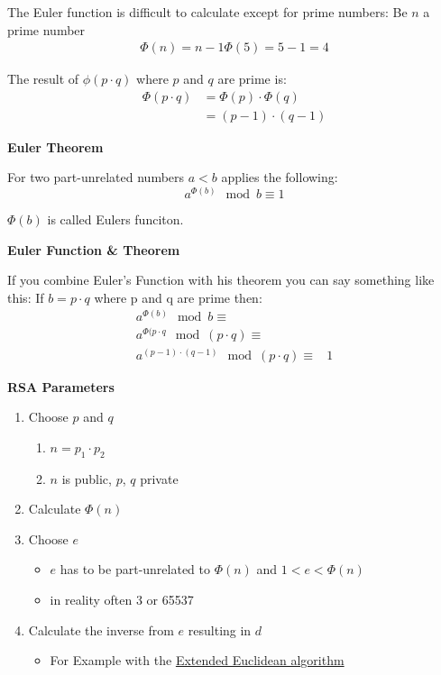 \documentclass[11pt,twoside,twocolumn,landscape]{article}
\begin{document}
The Euler function is difficult to calculate except for prime numbers:
Be \(n\) a prime number
\begin{align}
\Phi(n) = n - 1
\Phi(5) = 5 - 1 = 4
\end{align}

The result of \(\phi(p \cdot q)\) where \(p\) and \(q\) are prime is:
\begin{align}
\Phi(p \cdot q) &= \Phi(p) \cdot \Phi(q) \\
&= (p - 1) \cdot (q - 1)
\end{align}

\textbf{Euler Theorem}

For two part-unrelated numbers \(a < b\) applies the following:
\begin{equation}
a^{\Phi(b)} \mod b \equiv 1
\end{equation}


\(\Phi(b)\) is called Eulers funciton.

\textbf{Euler Function \& Theorem}

If you combine Euler's Function with his theorem you can say something like this:
If \(b = p \cdot q\) where p and q are prime then:
\begin{align}
a^{\Phi(b)} \mod b \equiv & \\
a^{\Phi(p \cdot q} \mod (p \cdot q) \equiv & \\
a^{(p - 1) \cdot (q-1)} \mod (p \cdot q) \equiv & 1
\end{align}

\textbf{RSA Parameters}

\begin{enumerate}
\item Choose \(p\) and \(q\)
\begin{enumerate}
\item \(n = p_1 \cdot p_2\)
\item \(n\) is public, \(p\), \(q\) private
\end{enumerate}
\item Calculate \(\Phi(n)\)
\item Choose \(e\)
\begin{itemize}
\item \(e\) has to be part-unrelated to \(\Phi(n)\) and \(1 < e < \Phi(n)\)
\item in reality often 3 or 65537
\end{itemize}
\item Calculate the inverse from \(e\) resulting in \(d\)
\begin{itemize}
\item For Example with the \href{../../../roam/20211104174408-extended_euclidean_algorithm.org}{Extended Euclidean algorithm}
\end{itemize}
\end{enumerate}
\end{document}
